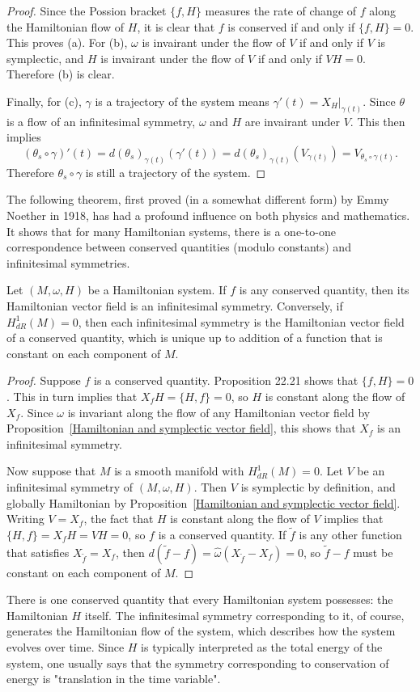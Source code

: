 \begin{proof}
Since the Possion bracket $\{f,H\}$ measures the rate of change of $f$ along the Hamiltonian flow of $H$, it is clear that $f$ is conserved if and only if $\{f,H\}=0$. This proves (a). For (b), $\omega$ is invairant under the flow of $V$ if and only if $V$ is symplectic, and $H$ is invairant under the flow of $V$ if and only if $VH=0$. Therefore (b) is clear.\par
Finally, for (c), $\gamma$ is a trajectory of the system means $\gamma'(t)=X_H|_{\gamma(t)}$. Since $\theta$ is a flow of an infinitesimal symmetry, $\omega$ and $H$ are invairant under $V$. This then implies 
\[(\theta_s\circ\gamma)'(t)=d(\theta_s)_{\gamma(t)}(\gamma'(t))=d(\theta_s)_{\gamma(t)}(V_{\gamma(t)})=V_{\theta_s\circ\gamma(t)}.\]
Therefore $\theta_s\circ\gamma$ is still a trajectory of the system.
\end{proof}
The following theorem, first proved (in a somewhat different form) by Emmy
Noether in 1918, has had a profound influence on both physics and mathematics. It shows that for many Hamiltonian systems, there is a one-to-one correspondence between conserved quantities (modulo constants) and infinitesimal symmetries.
\begin{theorem}
Let $(M,\omega,H)$ be a Hamiltonian system. If $f$ is any conserved quantity, then its Hamiltonian vector field is an infinitesimal symmetry. Conversely, if $H^1_{dR}(M)=0$, then each infinitesimal symmetry is the Hamiltonian vector field of a conserved quantity, which is unique up to addition of a function that is constant on each component of $M$.
\end{theorem}
\begin{proof}
Suppose $f$ is a conserved quantity. Proposition 22.21 shows that $\{f,H\}=0$. This in turn implies that $X_fH=\{H,f\}=0$, so $H$ is constant along the flow of $X_f$. Since $\omega$ is invariant along the flow of any Hamiltonian vector field by Proposition~\ref{Hamiltonian and symplectic vector field}, this shows that $X_f$ is an infinitesimal symmetry.\par
Now suppose that $M$ is a smooth manifold with $H^1_{dR}(M)=0$. Let $V$ be an infinitesimal symmetry of $(M,\omega,H)$. Then $V$ is symplectic by definition, and globally Hamiltonian by Proposition~\ref{Hamiltonian and symplectic vector field}. Writing $V=X_f$, the fact that $H$ is constant along the flow of $V$ implies that $\{H,f\}=X_fH=VH=0$, so $f$ is a conserved quantity. If $\widetilde{f}$ is any other function that satisfies $X_{\widetilde{f}}=X_f$, then $d(\widetilde{f}-f)=\widehat{\omega}(X_{\widetilde{f}}-X_f)=0$, so $\widetilde{f}-f$ must be constant on each component of $M$.
\end{proof}
There is one conserved quantity that every Hamiltonian system possesses: the Hamiltonian $H$ itself. The infinitesimal symmetry corresponding to it, of course, generates the Hamiltonian flow of the system, which describes how the system evolves over time. Since $H$ is typically interpreted as the total energy of the system, one usually says that the symmetry corresponding to conservation of energy is "translation in the time variable".
